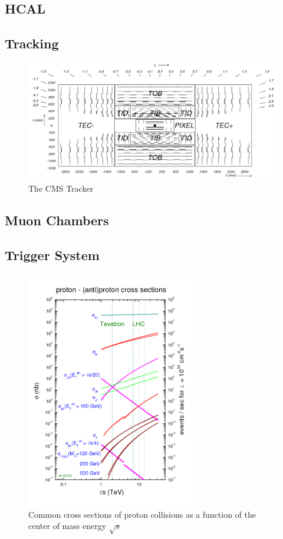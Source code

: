 \subsection{HCAL}

\subsection{Tracking}

\begin{figure}
\begin{center}
\includegraphics[width=.9\textwidth]{figures/an_jetid/DETECTOR/cms_tracker}
\end{center}
\caption{The CMS Tracker}
\label{fig:tracker}
\end{figure}

\subsection{Muon Chambers}

\subsection{Trigger System}

\begin{figure}
\begin{center}
\includegraphics[width=2.9in]{figures/exp_proj/pdf_xsec.png}
\caption{Common cross sections of proton collisions as a function of the center of mass energy $\sqrt{s}$}
\end{center}
\label{fig:pdf_xsec}
\end{figure}

